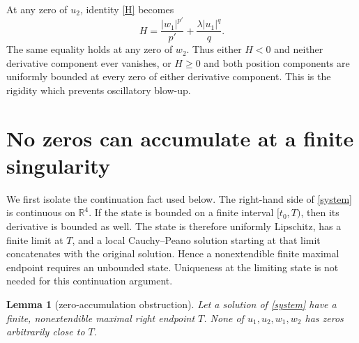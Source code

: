 \documentclass[11pt]{article}
\newtheorem{lemma}{Lemma}
\begin{document}
At any zero of $u_2$, identity \eqref{H} becomes
\begin{equation}\label{zero-u2}
 H=\frac{|w_1|^{p'}}{p'}+\frac{\lambda|u_1|^q}{q}.
\end{equation}
The same equality holds at any zero of $w_2$.  Thus either $H<0$ and neither
derivative component ever vanishes, or $H\geq0$ and both position components
are uniformly bounded at every zero of either derivative component.  This is
the rigidity which prevents oscillatory blow-up.

\section{No zeros can accumulate at a finite singularity}

We first isolate the continuation fact used below.  The right-hand side of
\eqref{system} is continuous on $\mathbb R^4$.  If the state is bounded on a
finite interval $[t_0,T)$, then its derivative is bounded as well.  The state
is therefore uniformly Lipschitz, has a finite limit at $T$, and a local
Cauchy--Peano solution starting at that limit concatenates with the original
solution.  Hence a nonextendible finite maximal endpoint requires an
unbounded state.  Uniqueness at the limiting state is not needed for this
continuation argument.

\begin{lemma}[zero-accumulation obstruction]\label{zeros}
Let a solution of \eqref{system} have a finite, nonextendible maximal right
endpoint $T$.  None of $u_1,u_2,w_1,w_2$ has zeros arbitrarily close to $T$.
\end{lemma}
\end{document}
